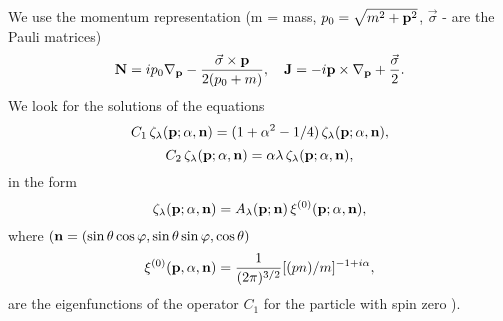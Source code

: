 \documentclass[a4paper,12pt]{article}
\begin{document}
We use the momentum representation  (m = mass, $p_0=\sqrt{m^2+{\bf p}^2}$,  ${\vec \sigma}$ - are the Pauli matrices)
\begin{equation}
\label{7}
{\bf N}=ip_0{\nabla}_{\bf p}-\frac{{\vec \sigma}\times{\bf p}}
{2(p_0+m)},\quad{\bf J}=-i{\bf p}\times{\bf \nabla}_{\bf p}
+\frac{\vec \sigma}{2}.                    
\end{equation}
We look for the solutions of the equations 
\begin{equation}
\label{8}
C_1\,\zeta_{\lambda}({\bf p};{\alpha},{\bf n})= (1+\alpha^2-1/4)\,\zeta_{\lambda}({\bf p};{\alpha},{\bf n}),
\end{equation}
\begin{equation}
\label{9}
C_2\,\zeta_{\lambda}({\bf p};{\alpha},{\bf n})={\alpha}{\lambda}\,\zeta_{\lambda}({\bf p};{\alpha},{\bf n}),
\end{equation}
in the form 
\begin{equation}
\label{10}
\zeta_{\lambda}({\bf p};{\alpha},{\bf n})=A_{\lambda}({\bf p};{\bf n})\,\xi^{(0)}({\bf p};{\alpha},{\bf n}),
\end{equation}
where $({\bf n}=(\sin{\theta}\cos{\varphi},\sin{\theta}\sin{\varphi},\cos{\theta})$
\begin{equation}
\label{11}
\xi^{(0)}({\bf p},{\alpha},{\bf n})=\frac{1}{(2\pi)^{3/2}}[(pn)/m]^{-1+i\alpha},
\end{equation}
are the  eigenfunctions of the operator $C_1$ for the particle with spin zero   \cite{Shapiro,Kad,Ska}).
\end{document}
